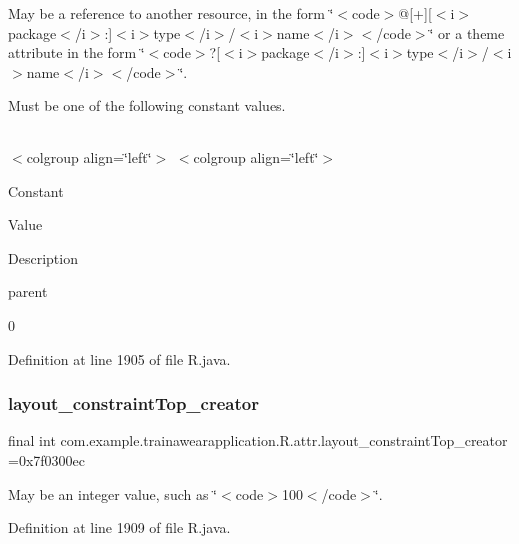 May be a reference to another resource, in the form \char`\"{}$<$code$>$@\mbox{[}+\mbox{]}\mbox{[}$<$i$>$package$<$/i$>$\+:\mbox{]}$<$i$>$type$<$/i$>$/$<$i$>$name$<$/i$>$$<$/code$>$\char`\"{} or a theme attribute in the form \char`\"{}$<$code$>$?\mbox{[}$<$i$>$package$<$/i$>$\+:\mbox{]}$<$i$>$type$<$/i$>$/$<$i$>$name$<$/i$>$$<$/code$>$\char`\"{}. 

Must be one of the following constant values.

\tabulinesep=1mm
\begin{longtabu}spread 0pt [c]{*{0}{|X[-1]}|}
\hline
\end{longtabu}
$<$colgroup align=\char`\"{}left\char`\"{}$>$ $<$colgroup align=\char`\"{}left\char`\"{}$>$ 

Constant

Value

Description 

parent

0

Definition at line 1905 of file R.\+java.

\mbox{\label{classcom_1_1example_1_1trainawearapplication_1_1_r_1_1attr_aeb27640017a58164c73acb56c40d7653}} 
\subsubsection{\texorpdfstring{layout\_constraintTop\_creator}{layout\_constraintTop\_creator}}
{\footnotesize\ttfamily final int com.\+example.\+trainawearapplication.\+R.\+attr.\+layout\+\_\+constraint\+Top\+\_\+creator =0x7f0300ec\hspace{0.3cm}{\ttfamily [static]}}

May be an integer value, such as \char`\"{}$<$code$>$100$<$/code$>$\char`\"{}. 

Definition at line 1909 of file R.\+java.

\mbox{\label{classcom_1_1example_1_1trainawearapplication_1_1_r_1_1attr_af53030c6c83202887597bbb31ef2ee77}} 
